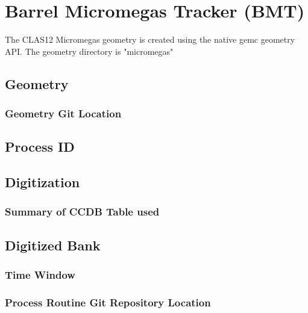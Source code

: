 \section{Barrel Micromegas Tracker (BMT)}

The CLAS12 Micromegas geometry is created using the native gemc geometry API.
The geometry directory is "micromegas"

\subsection{Geometry}

\subsubsection{Geometry Git Location}

\subsection{Process ID}

\subsection{Digitization}

\subsubsection{Summary of CCDB Table used}

\subsection{Digitized Bank}

\subsubsection{Time Window}

\subsubsection{Process Routine Git Repository Location}


